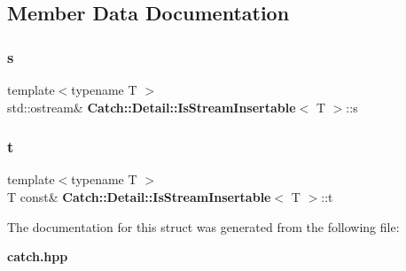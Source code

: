 \subsection{Member Data Documentation}
\mbox{\label{struct_catch_1_1_detail_1_1_is_stream_insertable_abe3d3c8e5d85665747faafffc9a96b00}} 
\subsubsection{s}
{\footnotesize\ttfamily template$<$typename T $>$ \\
std\+::ostream\& \textbf{ Catch\+::\+Detail\+::\+Is\+Stream\+Insertable}$<$ T $>$\+::s\hspace{0.3cm}{\ttfamily [static]}}

\mbox{\label{struct_catch_1_1_detail_1_1_is_stream_insertable_a7d2a3da978b6736667a7b2f6d51f507f}} 
\subsubsection{t}
{\footnotesize\ttfamily template$<$typename T $>$ \\
T const\& \textbf{ Catch\+::\+Detail\+::\+Is\+Stream\+Insertable}$<$ T $>$\+::t\hspace{0.3cm}{\ttfamily [static]}}



The documentation for this struct was generated from the following file\+:\begin{DoxyCompactItemize}
\item 
\textbf{ catch.\+hpp}\end{DoxyCompactItemize}
